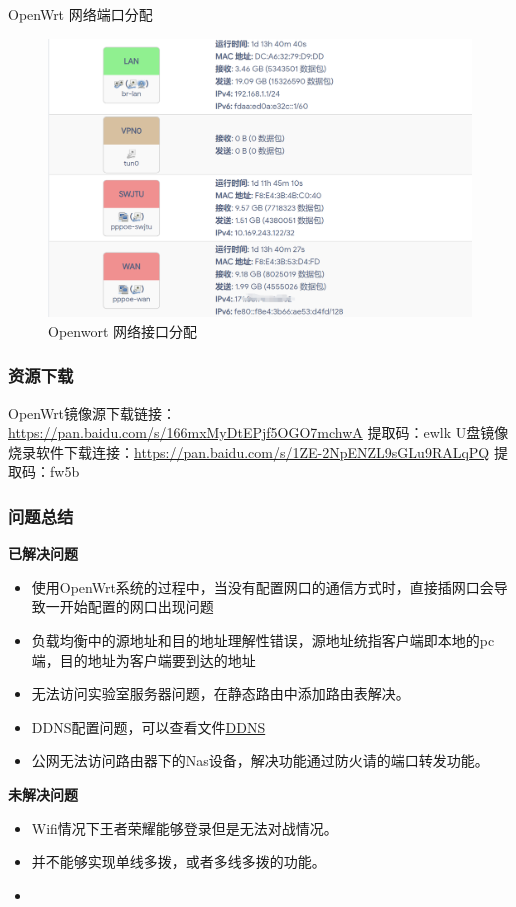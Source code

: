 \documentclass[cn,hazy,blue,10.5pt,normal]{elegantnote}
\begin{document}
OpenWrt 网络端口分配

\begin{figure}[htbp]
  \centering
  \includegraphics[scale=0.25]{image/port.png}
  \caption{Openwort 网络接口分配}\label{fig:1.2}
\end{figure}

\subsubsection{资源下载}
OpenWrt镜像源下载链接：\url{https://pan.baidu.com/s/166mxMyDtEPjf5OGO7mchwA}  提取码：ewlk 
U盘镜像烧录软件下载连接：\url{https://pan.baidu.com/s/1ZE-2NpENZL9sGLu9RALqPQ}  提取码：fw5b


\subsubsection{问题总结} 

\textbf{已解决问题}
\begin{itemize}
  \item 使用OpenWrt系统的过程中，当没有配置网口的通信方式时，直接插网口会导致一开始配置的网口出现问题
  \item 负载均衡中的源地址和目的地址理解性错误，源地址统指客户端即本地的pc端，目的地址为客户端要到达的地址
  \item 无法访问实验室服务器问题，在静态路由中添加路由表解决。
  \item DDNS配置问题，可以查看文件\href{run:./other_guide/openwrt_set_DDNS.pdf}{DDNS}
  \item 公网无法访问路由器下的Nas设备，解决功能通过防火请的端口转发功能。
\end{itemize}

\textbf{未解决问题}
\begin{itemize}
  \item Wifi情况下王者荣耀能够登录但是无法对战情况。
  \item 并不能够实现单线多拨，或者多线多拨的功能。
  \item 
\end{itemize}
\end{document}
